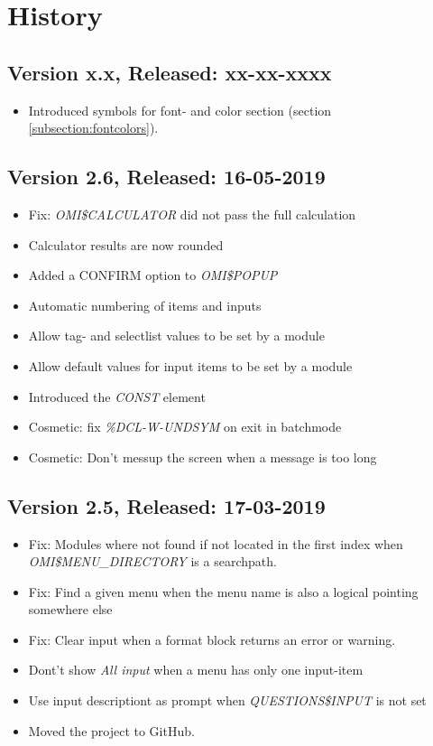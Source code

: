 \documentclass[a4paper]{book}
\begin{document}
\chapter{History}

\section*{Version x.x, Released: xx-xx-xxxx}

\begin{itemize}
\item Introduced symbols for font- and color section (section \ref{subsection:fontcolors}).
\end{itemize}


\section*{Version 2.6, Released: 16-05-2019}

\begin{itemize}
\item Fix: \textsl{OMI{\$}CALCULATOR} did not pass the full calculation
\item Calculator results are now rounded
\item Added a CONFIRM option to \textsl{OMI{\$}POPUP}
\item Automatic numbering of items and inputs
\item Allow tag- and selectlist values to be set by a module
\item Allow default values for input items to be set by a module
\item Introduced the \textsl{CONST} element
\item Cosmetic: fix \textsl{\%DCL-W-UNDSYM} on exit in batchmode
\item Cosmetic: Don't messup the screen when a message is too long
\end{itemize}

\section*{Version 2.5, Released: 17-03-2019}

\begin{itemize}
\item Fix: Modules where not found if not located in the first index when \textsl{OMI{\$}MENU{\_}DIRECTORY} is a searchpath.
\item Fix: Find a given menu when the menu name is also a logical pointing somewhere else
\item Fix: Clear input when a format block returns an error or warning.
\item Dont't show \textsl{All input} when a menu has only one input-item
\item Use input descriptiont as prompt when \textsl{QUESTIONS{\$}INPUT} is not set
\item Moved the project to GitHub.
\end{itemize}
\end{document}
